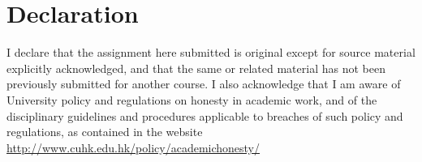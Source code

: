 \documentclass[11pt]{article}
\begin{document}
\section{Declaration}
I declare that the assignment here submitted is original except for source material explicitly acknowledged, and that the same or related material has not been previously submitted for another course. I also acknowledge that I am aware of University policy and regulations on honesty in academic work, and of the disciplinary guidelines and procedures applicable to breaches of such policy and regulations, as contained in the website \url{http://www.cuhk.edu.hk/policy/academichonesty/}
\end{document}

